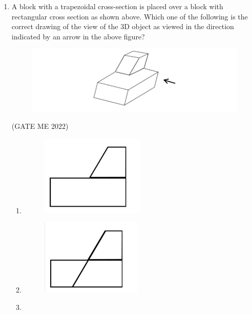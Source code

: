 \documentclass[journal]{IEEEtran}
\numberwithin{equation}{enumi}
\numberwithin{figure}{enumi}
\begin{document}
\begin{enumerate}
\item A block with a trapezoidal cross-section is placed over a block with rectangular cross section as shown above. Which one of the following is the correct drawing of the view of the 3D object as viewed in the direction indicated by an arrow in the above figure?
 \begin{figure}[H]
    \centering
    \includegraphics[width = 0.6\columnwidth]{figs/fig4.1.png}
    \caption*{}
    \label{fig:Q5}
    \end{figure}
    \hfill{(GATE ME 2022)}
\begin{enumerate} 
\item \begin{figure}[H]
    \centering
    \includegraphics[width = 0.5\columnwidth]{figs/fig4.2.png}
    \caption*{}
    \label{fig:Q5}
    \end{figure}
\item \begin{figure}[H]
    \centering
    \includegraphics[width = 0.5\columnwidth]{figs/fig4.3.png}
    \caption*{}
    \label{fig:Q5}
    \end{figure}
\item \begin{figure}[H]
    \centering

\end{figure}
\end{enumerate}
\end{enumerate}
\end{document}
